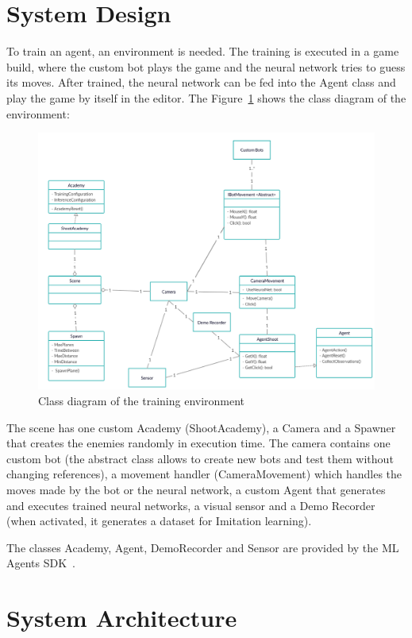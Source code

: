 \section{System Design}
\label{sec:system_design}

To train an agent, an environment is needed. The training is executed in a game build, where the custom bot plays the game and the neural network tries to guess its moves. After trained, the neural network can be fed into the Agent class and play the game by itself in the editor. The Figure~\ref{fig:classes} shows the class diagram of the environment:
\begin{figure}[b]
  \centering
		\includegraphics[width=.8\textwidth]{img/classDiagram.png}
  \caption{Class diagram of the training environment}
  \label{fig:classes}
\end{figure}

The scene has one custom Academy (ShootAcademy), a Camera and a Spawner that creates the enemies randomly in execution time. The camera contains one custom bot (the abstract class allows to create new bots and test them without changing references), a movement handler (CameraMovement) which handles the moves made by the bot or the neural network, a custom Agent that generates and executes trained neural networks, a visual sensor and a Demo Recorder (when activated, it generates a dataset for Imitation learning).

The classes Academy, Agent, DemoRecorder and Sensor are provided by the ML Agents SDK~\cite{mlagents}.

\section{System Architecture}
\label{sec:sysarch}

